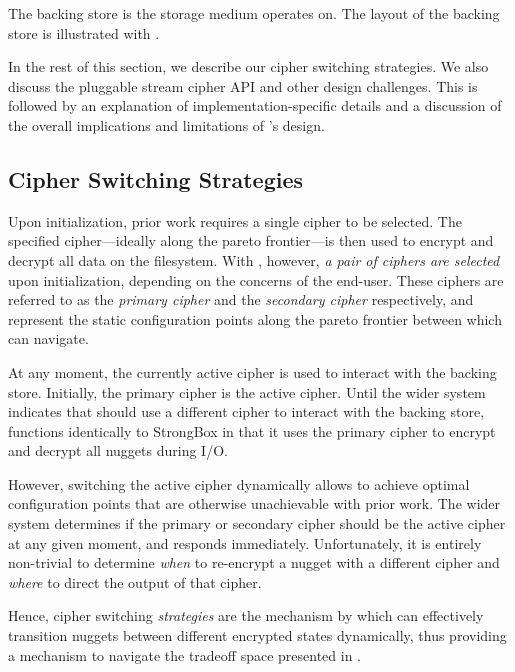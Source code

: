 The backing store is the storage medium \SYSTEM{} operates on. The layout of the
backing store is illustrated with . 

In the rest of this section, we describe our cipher switching strategies. We
also discuss the pluggable stream cipher API and other design challenges. This
is followed by an explanation of implementation-specific details and a
discussion of the overall implications and limitations of \SYSTEM{}'s design.

\subsection{Cipher Switching Strategies}

Upon initialization, prior work requires a single cipher to be selected. The
specified cipher---ideally along the pareto frontier---is then used to encrypt
and decrypt all data on the filesystem. With \SYSTEM{}, however, \emph{a pair of
ciphers are selected} upon initialization, depending on the concerns of the
end-user. These ciphers are referred to as the \emph{primary cipher} and the
\emph{secondary cipher} respectively, and represent the static configuration
points along the pareto frontier between which \SYSTEM{} can navigate.

At any moment, the currently active cipher is used to interact with the backing
store. Initially, the primary cipher is the active cipher. Until the wider
system indicates that \SYSTEM{} should use a different cipher to interact with
the backing store, \SYSTEM{} functions identically to StrongBox in that it uses
the primary cipher to encrypt and decrypt all nuggets during I/O.

However, switching the active cipher dynamically allows \SYSTEM{} to achieve
optimal configuration points that are otherwise unachievable with prior work.
The wider system determines if the primary or secondary cipher should be the
active cipher at any given moment, and \SYSTEM{} responds immediately.
Unfortunately, it is entirely non-trivial to determine \emph{when} to re-encrypt
a nugget with a different cipher and \emph{where} to direct the output of that
cipher.

Hence, cipher switching \emph{strategies} are the mechanism by which \SYSTEM{}
can effectively transition nuggets between different encrypted states
dynamically, thus providing a mechanism to navigate the tradeoff space presented
in . 


